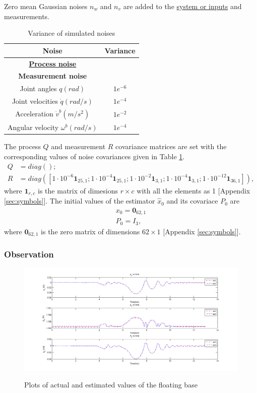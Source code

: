 Zero mean Gaussian noises $n_w$ and $n_v$ are added to the \underline{system or inputs} and measurements.
\begin{table}[H]
    \centering
    \begin{tabular}{|c|c|}
    \hline
    Noise &Variance \\ \hline
    \textbf{\underline{Process noise}} &\hspace{2mm}\\
    \hline
    \textbf{Measurement noise} &\hspace{2mm}\\
    Joint angles $q(rad)$ &$1e^{-6}$ \\ 
    Joint velocities $\dot q(rad/s)$ &$1e^{-4}$ \\
    Acceleration $\dot v^b(m/s^2)$ &$1e^{-2}$ \\ 
    Angular velocity $\omega^b(rad/s)$ &$1e^{-4}$ \\ \hline
    \end{tabular}
    \caption{Variance of simulated noises}
    \label{tab:toro_var}
\end{table}

The process $Q$ and measurement $R$ covariance matrices are set with the corresponding values of noise covariances given in Table \ref{tab:toro_var}. 
$$  \begin{aligned}
         Q &= diag();\\
         R &= diag([1\cdot{10}^{-6} \textbf{1}_{25,1}; 1\cdot{10}^{-4}\textbf{1}_{25,1}; 1\cdot{10}^{-2}\textbf{1}_{3,1};1\cdot{10}^{-4}\textbf{1}_{3,1}; 1\cdot{10}^{-12}\textbf{1}_{36,1} ]),
     \end{aligned}$$
where $\textbf{1}_{r,c}$ is the matrix of dimesions $r \times c$ with all the elements as 1 [Appendix \ref{sec:symbols}]. The initial values of the estimator $\hat x_0$ and its covariace $P_0$ are 
$$ \begin{aligned} x_0 = \textbf{0}_{62,1}\\ P_0 = I_3, \end{aligned} $$  where $\textbf{0}_{62,1}$ is the zero matrix of dimensions $62 \times 1$ [Appendix \ref{sec:symbols}].


\subsubsection{Observation}
\begin{figure}
    \centering
    \includegraphics[scale=0.7]{Bilder/toro_pos.png}
    \label{fig:toro_pos}
    \caption{Plots of actual and estimated values of the floating base}
\end{figure}

